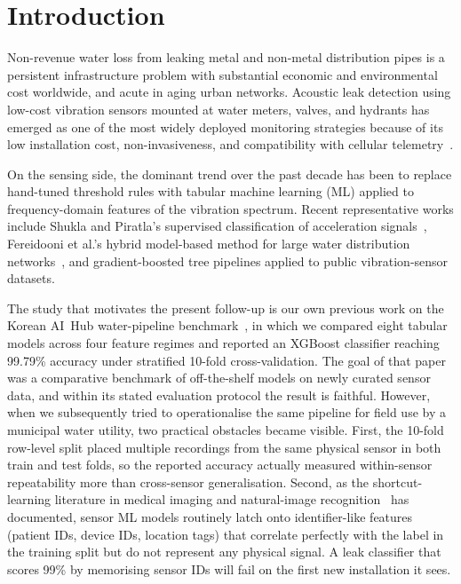 \documentclass[sensors,article,submit,pdftex,oneauthor]{Definitions/mdpi}
\begin{document}

\section{Introduction}\label{sec:intro}

Non-revenue water loss from leaking metal and non-metal
distribution pipes is a persistent infrastructure problem with
substantial economic and environmental cost worldwide, and acute
in aging urban networks. Acoustic leak detection using low-cost
vibration sensors mounted at water meters, valves, and hydrants
has emerged as one of the most widely deployed monitoring
strategies because of its low installation cost, non-invasiveness,
and compatibility with cellular telemetry~\cite{hunaidi2000plastic,ismail2019review}.

On the sensing side, the dominant trend over the past decade has
been to replace hand-tuned threshold rules with tabular machine
learning (ML) applied to frequency-domain features of the
vibration spectrum. Recent representative works include
Shukla and Piratla's supervised classification of acceleration
signals~\cite{shukla2020leakage}, Fereidooni et al.'s hybrid
model-based method for large water distribution
networks~\cite{fereidooni2021hybrid}, and gradient-boosted tree
pipelines applied to public vibration-sensor datasets.

The study that motivates the present follow-up is our own
previous work on the Korean AI~Hub water-pipeline
benchmark~\cite{lee2023leak}, in which we compared eight tabular
models across four feature regimes and reported an XGBoost
classifier reaching 99.79\% accuracy under stratified 10-fold
cross-validation. The goal of that paper was a comparative
benchmark of off-the-shelf models on newly curated sensor data,
and within its stated evaluation protocol the result is
faithful. However, when we subsequently tried to operationalise
the same pipeline for field use by a municipal water utility,
two practical obstacles became visible. First, the 10-fold
row-level split placed multiple recordings from the same
physical sensor in both train and test folds, so the reported
accuracy actually measured within-sensor repeatability more
than cross-sensor generalisation. Second, as the shortcut-learning
literature in medical imaging
\cite{zech2018pneumonia,degrave2021covid,geirhos2020shortcut,damour2022underspec}
and natural-image recognition~\cite{beery2018terra} has
documented, sensor ML models routinely latch onto identifier-like
features (patient IDs, device IDs, location tags) that correlate
perfectly with the label in the training split but do not
represent any physical signal. A leak classifier that scores
99\% by memorising sensor IDs will fail on the first new
installation it sees.
\end{document}
